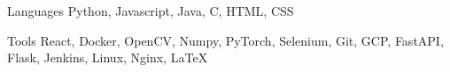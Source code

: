 

\begin{cvskills}

  \cvskill
    {Languages} %
    {Python, Javascript, Java, C, HTML, CSS} %

  \cvskill
    {Tools} %
    {React, Docker, OpenCV, Numpy, PyTorch, Selenium, Git, GCP, FastAPI, Flask, Jenkins, Linux, Nginx, LaTeX} %

\end{cvskills}

